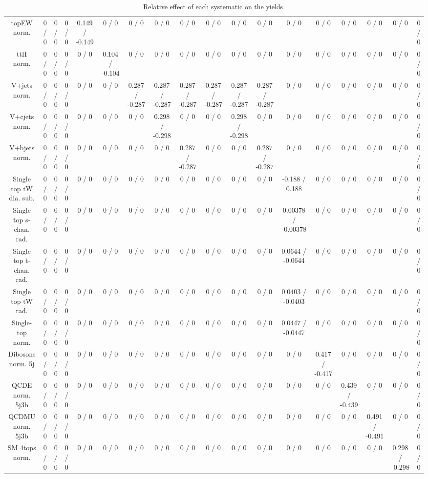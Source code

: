 \documentclass[10pt]{article}
\begin{document}
\begin{table}[htbp]
\begin{center}
\begin{tabular}{|c|c|c|c|c|c|c|c|c|c|c|c|c|c|c|c|c|c|}
  topEW norm. & 0 / 0 & 0 / 0 & 0 / 0 & 0.149 / -0.149 & 0 / 0 & 0 / 0 & 0 / 0 & 0 / 0 & 0 / 0 & 0 / 0 & 0 / 0 & 0 / 0 & 0 / 0 & 0 / 0 & 0 / 0 & 0 / 0 & 0 / 0 \\ 
  ttH norm. & 0 / 0 & 0 / 0 & 0 / 0 & 0 / 0 & 0.104 / -0.104 & 0 / 0 & 0 / 0 & 0 / 0 & 0 / 0 & 0 / 0 & 0 / 0 & 0 / 0 & 0 / 0 & 0 / 0 & 0 / 0 & 0 / 0 & 0 / 0 \\ 
  V+jets norm. & 0 / 0 & 0 / 0 & 0 / 0 & 0 / 0 & 0 / 0 & 0.287 / -0.287 & 0.287 / -0.287 & 0.287 / -0.287 & 0.287 / -0.287 & 0.287 / -0.287 & 0.287 / -0.287 & 0 / 0 & 0 / 0 & 0 / 0 & 0 / 0 & 0 / 0 & 0 / 0 \\ 
  V+cjets norm. & 0 / 0 & 0 / 0 & 0 / 0 & 0 / 0 & 0 / 0 & 0 / 0 & 0.298 / -0.298 & 0 / 0 & 0 / 0 & 0.298 / -0.298 & 0 / 0 & 0 / 0 & 0 / 0 & 0 / 0 & 0 / 0 & 0 / 0 & 0 / 0 \\ 
  V+bjets norm. & 0 / 0 & 0 / 0 & 0 / 0 & 0 / 0 & 0 / 0 & 0 / 0 & 0 / 0 & 0.287 / -0.287 & 0 / 0 & 0 / 0 & 0.287 / -0.287 & 0 / 0 & 0 / 0 & 0 / 0 & 0 / 0 & 0 / 0 & 0 / 0 \\ 
  Single top tW dia. sub. & 0 / 0 & 0 / 0 & 0 / 0 & 0 / 0 & 0 / 0 & 0 / 0 & 0 / 0 & 0 / 0 & 0 / 0 & 0 / 0 & 0 / 0 & -0.188 / 0.188 & 0 / 0 & 0 / 0 & 0 / 0 & 0 / 0 & 0 / 0 \\ 
  Single top s-chan. rad. & 0 / 0 & 0 / 0 & 0 / 0 & 0 / 0 & 0 / 0 & 0 / 0 & 0 / 0 & 0 / 0 & 0 / 0 & 0 / 0 & 0 / 0 & 0.00378 / -0.00378 & 0 / 0 & 0 / 0 & 0 / 0 & 0 / 0 & 0 / 0 \\ 
  Single top t-chan. rad. & 0 / 0 & 0 / 0 & 0 / 0 & 0 / 0 & 0 / 0 & 0 / 0 & 0 / 0 & 0 / 0 & 0 / 0 & 0 / 0 & 0 / 0 & 0.0644 / -0.0644 & 0 / 0 & 0 / 0 & 0 / 0 & 0 / 0 & 0 / 0 \\ 
  Single top tW rad. & 0 / 0 & 0 / 0 & 0 / 0 & 0 / 0 & 0 / 0 & 0 / 0 & 0 / 0 & 0 / 0 & 0 / 0 & 0 / 0 & 0 / 0 & 0.0403 / -0.0403 & 0 / 0 & 0 / 0 & 0 / 0 & 0 / 0 & 0 / 0 \\ 
  Single-top norm. & 0 / 0 & 0 / 0 & 0 / 0 & 0 / 0 & 0 / 0 & 0 / 0 & 0 / 0 & 0 / 0 & 0 / 0 & 0 / 0 & 0 / 0 & 0.0447 / -0.0447 & 0 / 0 & 0 / 0 & 0 / 0 & 0 / 0 & 0 / 0 \\ 
  Dibosons norm. 5j & 0 / 0 & 0 / 0 & 0 / 0 & 0 / 0 & 0 / 0 & 0 / 0 & 0 / 0 & 0 / 0 & 0 / 0 & 0 / 0 & 0 / 0 & 0 / 0 & 0.417 / -0.417 & 0 / 0 & 0 / 0 & 0 / 0 & 0 / 0 \\ 
  QCDE norm. 5j3b & 0 / 0 & 0 / 0 & 0 / 0 & 0 / 0 & 0 / 0 & 0 / 0 & 0 / 0 & 0 / 0 & 0 / 0 & 0 / 0 & 0 / 0 & 0 / 0 & 0 / 0 & 0.439 / -0.439 & 0 / 0 & 0 / 0 & 0 / 0 \\ 
  QCDMU norm. 5j3b & 0 / 0 & 0 / 0 & 0 / 0 & 0 / 0 & 0 / 0 & 0 / 0 & 0 / 0 & 0 / 0 & 0 / 0 & 0 / 0 & 0 / 0 & 0 / 0 & 0 / 0 & 0 / 0 & 0.491 / -0.491 & 0 / 0 & 0 / 0 \\ 
  SM 4tops norm. & 0 / 0 & 0 / 0 & 0 / 0 & 0 / 0 & 0 / 0 & 0 / 0 & 0 / 0 & 0 / 0 & 0 / 0 & 0 / 0 & 0 / 0 & 0 / 0 & 0 / 0 & 0 / 0 & 0 / 0 & 0.298 / -0.298 & 0 / 0 \\ 
\hline 
\end{tabular} 
\caption{Relative effect of each systematic on the yields.} 
\end{center} 
\end{table} 
\end{document}
